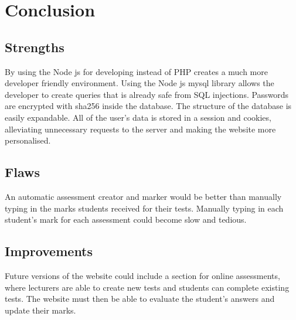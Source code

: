 \documentclass[a4paper,12pt]{article}
\numberwithin{equation}{section} %
\numberwithin{figure}{section}
\begin{document}


%

\pagebreak
\section{Conclusion}

\subsection{Strengths}
By using the Node js for developing instead of PHP creates a much more developer friendly environment. Using the Node js mysql library allows the developer to create queries that is already safe from SQL injections. Passwords are encrypted with sha256 inside the database. The structure of the database is easily expandable. All of the user's data is stored in a session and cookies, alleviating unnecessary requests to the server and making the website more personalised.   

\subsection{Flaws}
An automatic assessment creator and marker would be better than manually typing in the marks students received for their tests. Manually typing in each student's mark for each assessment could become slow and tedious. 

\subsection{Improvements}
Future versions of the website could include a section for online assessments, where lecturers are able to create new tests and students can complete existing tests. The website must then be able to evaluate the student's answers and update their marks.
\end{document}
